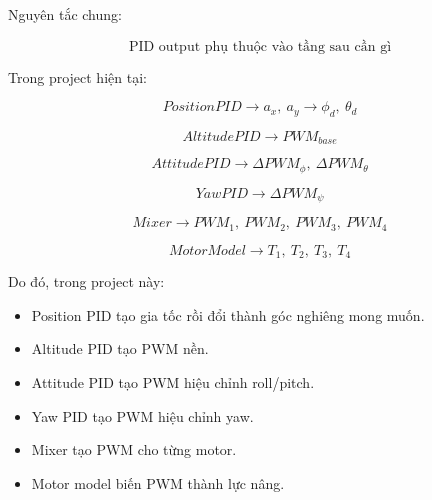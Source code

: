 Nguyên tắc chung:

\begin{equation}
    \boxed{
    \text{PID output phụ thuộc vào tầng sau cần gì}
    }
\end{equation}

Trong project hiện tại:

\begin{equation}
    PositionPID
    \longrightarrow
    a_x,\ a_y
    \longrightarrow
    \phi_d,\ \theta_d
\end{equation}

\begin{equation}
    AltitudePID
    \longrightarrow
    PWM_{base}
\end{equation}

\begin{equation}
    AttitudePID
    \longrightarrow
    \Delta PWM_\phi,\ \Delta PWM_\theta
\end{equation}

\begin{equation}
    YawPID
    \longrightarrow
    \Delta PWM_\psi
\end{equation}

\begin{equation}
    Mixer
    \longrightarrow
    PWM_1,\ PWM_2,\ PWM_3,\ PWM_4
\end{equation}

\begin{equation}
    MotorModel
    \longrightarrow
    T_1,\ T_2,\ T_3,\ T_4
\end{equation}

Do đó, trong project này:
\begin{itemize}
    \item Position PID tạo gia tốc rồi đổi thành góc nghiêng mong muốn.
    \item Altitude PID tạo PWM nền.
    \item Attitude PID tạo PWM hiệu chỉnh roll/pitch.
    \item Yaw PID tạo PWM hiệu chỉnh yaw.
    \item Mixer tạo PWM cho từng motor.
    \item Motor model biến PWM thành lực nâng.
\end{itemize}
